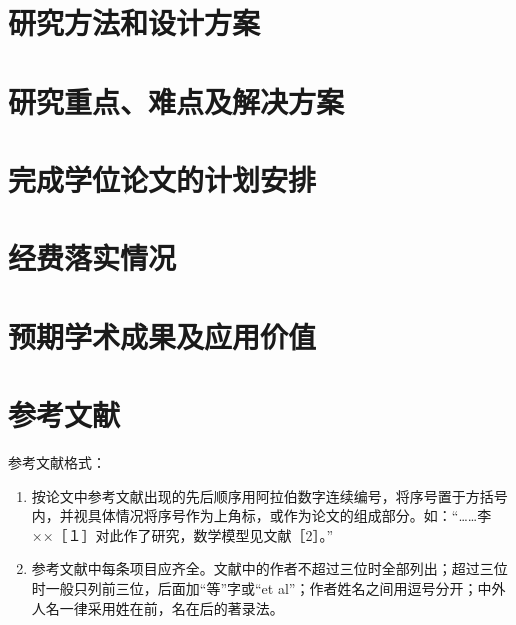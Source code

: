 \documentclass{suesreport}
\begin{document}
    \section{研究方法和设计方案}
    \section{研究重点、难点及解决方案}
    \section{完成学位论文的计划安排}
    \section{经费落实情况}
    \section{预期学术成果及应用价值}
    \section{参考文献}

    参考文献格式：
    \begin{enumerate}[label=\arabic*. ]
        \item 按论文中参考文献出现的先后顺序用阿拉伯数字连续编号，将序号置于方括号内，并视具体情况将序号作为上角标，或作为论文的组成部分。如：“……李××［１］对此作了研究，数学模型见文献［2］。”
        \item 参考文献中每条项目应齐全。文献中的作者不超过三位时全部列出；超过三位时一般只列前三位，后面加“等”字或“et al”；作者姓名之间用逗号分开；中外人名一律采用姓在前，名在后的著录法。
    \end{enumerate}
\end{document}
